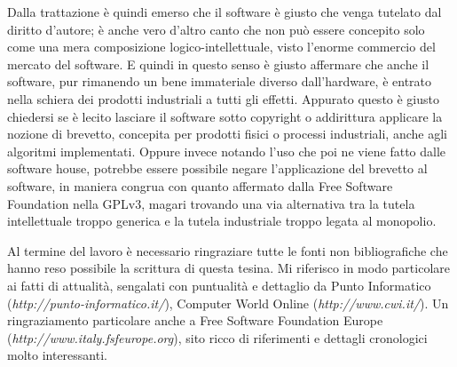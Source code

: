 Dalla trattazione è quindi emerso che il software è giusto che venga tutelato dal diritto d'autore; è anche vero d'altro canto che non può essere concepito solo come una mera composizione logico-intellettuale, visto l'enorme commercio del mercato del software. E quindi in questo senso è giusto affermare che anche il software, pur rimanendo un bene immateriale diverso dall'hardware, è entrato nella schiera dei prodotti industriali a tutti gli effetti. Appurato questo è giusto chiedersi se è lecito lasciare il software sotto copyright o addirittura applicare la nozione di brevetto, concepita per prodotti fisici o processi industriali, anche agli algoritmi implementati. Oppure invece notando l'uso che poi ne viene fatto dalle software house, potrebbe essere possibile negare l'applicazione del brevetto al software, in maniera congrua con quanto affermato dalla Free Software Foundation nella GPLv3, magari trovando una via alternativa tra la tutela intellettuale troppo generica e la tutela industriale troppo legata al monopolio.

Al termine del lavoro è necessario ringraziare tutte le fonti non bibliografiche che hanno reso possibile la scrittura di questa tesina. Mi riferisco in modo particolare ai fatti di attualità, sengalati con puntualità e dettaglio da Punto Informatico (\textit{http://punto-informatico.it/}), Computer World Online (\textit{http://www.cwi.it/}). Un ringraziamento particolare anche a Free Software Foundation Europe (\textit{http://www.italy.fsfeurope.org}), sito ricco di riferimenti e dettagli cronologici molto interessanti.